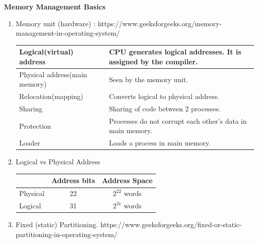 
\centerline{\textbf{ \LARGE Memory Management Basics}}


\begin{enumerate}

  \item Memory  unit (hardware) : https://www.geeksforgeeks.org/memory-management-in-operating-system/ \\
     \begin{myTableStyle}
      \begin{tabular}{ |m{5cm}|m{10cm}| } \hline
          Logical(virtual) address      &      CPU generates logical addresses. It is assigned by the compiler.    \\ \hline
          Physical address(main memory) &      Seen by the memory unit.    \\ \hline
          Relocation(mapping)           &      Converts logical to physical address.  \\ \hline
          Sharing                       &      Sharing of code between 2 processes. \\ \hline
          Protection                    &      Processes do not corrupt each other's data in main memory. \\ \hline
          Loader                        &      Loads a process in main memory. \\ \hline
      \end{tabular}
    \end{myTableStyle}
  \vspace{0.08in}

  \item Logical vs Physical Address \\
     \begin{myTableStyle}
      \begin{tabular}{ |m{2cm}|c|c| } \hline
                       &  Address bits    & Address Space          \\ \hline
          Physical     &  22    &   \(2^{22} \) words  \\ \hline
          Logical      &  31    &   \(2^{31} \) words   \\ \hline
      \end{tabular}
    \end{myTableStyle}
  \vspace{0.08in}

  \item Fixed (static) Partitioning. https://www.geeksforgeeks.org/fixed-or-static-partitioning-in-operating-system/


\end{enumerate}
